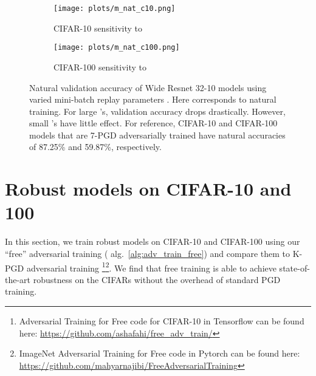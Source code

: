 \documentclass{article}
\begin{document}
\begin{figure}
    \centering
    \begin{subfigure}{0.40\textwidth}
        \texttt{[image: plots/m\_nat\_c10.png]}
        \caption{CIFAR-10 sensitivity to }
        \label{fig:c10_v_m}
    \end{subfigure}
        \begin{subfigure}{0.40\textwidth}
        \texttt{[image: plots/m\_nat\_c100.png]}
        \caption{CIFAR-100 sensitivity to }
        \label{fig:c100_v_m}    
    \end{subfigure}
    \caption{Natural validation accuracy of Wide Resnet 32-10 models using varied mini-batch replay parameters . Here  corresponds to natural training. For large 's, validation accuracy drops drastically. However, small 's have little effect. For reference, CIFAR-10 and CIFAR-100 models that are 7-PGD adversarially trained have natural accuracies of 87.25\% and 59.87\%, respectively.}
    \label{fig:cifars_m}
\end{figure}


\section{Robust models on CIFAR-10 and 100}
\label{sec:cifar}
In this section, we train robust models on CIFAR-10 and CIFAR-100 using our ``free'' adversarial training ( alg.~\ref{alg:adv_train_free}) and compare them to K-PGD adversarial training \footnote{Adversarial Training for Free code for CIFAR-10 in Tensorflow can be found here: \hyperlink{https://github.com/ashafahi/free_adv_train/}{\url{https://github.com/ashafahi/free_adv_train/}}}\footnote{ImageNet Adversarial Training for Free code in Pytorch can be found here: \hyperlink{https://github.com/mahyarnajibi/FreeAdversarialTraining}{\url{https://github.com/mahyarnajibi/FreeAdversarialTraining}}}.  We find that free training is able to achieve state-of-the-art robustness on the CIFARs without the overhead of standard PGD training.
\end{document}

